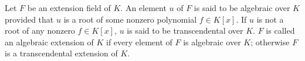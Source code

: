 Let $F$ be an extension field of $K$. An element $u$ of $F$ is said to be algebraic over $K$ provided that $u$ is a root of some nonzero polynomial $f \in K[x]$. If $u$ is not a root of any nonzero $f \in K[x]$, $u$ is said to be transcendental over $K$. $F$ is called an algebraic extension of $K$ if every element of $F$ is algebraic over $K$; otherwise $F$ is a transcendental extension of $K$.
